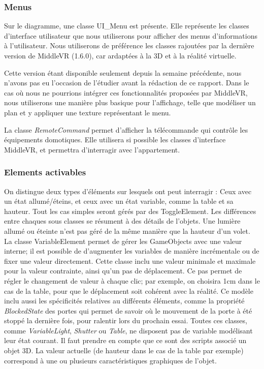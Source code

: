 \subsubsection{Menus}
Sur le diagramme, une classe UI\_Menu est présente. Elle représente les classes d'interface utilisateur que nous utiliserons pour afficher des menus d'informations à l'utilisateur. Nous utiliserons de préférence les classes rajoutées par la dernière version de MiddleVR (1.6.0), car ardaptées à la 3D et à la réalité virtuelle.\newline

Cette version étant disponible seulement depuis la semaine précédente, nous n'avons pas eu l'occasion de l'étudier avant la rédaction de ce rapport. Dans le cas où nous ne pourrions intégrer ces fonctionnalités proposées par MiddleVR, nous utiliserons une manière plus basique pour l'affichage, telle que modéliser un plan et y appliquer une texture représentant le menu.\newline

La classe \textit{RemoteCommand} permet d'afficher la télécommande qui contrôle les équipements domotiques. 
Elle utilisera si possible les classes d'interface MiddleVR, et permettra d'interragir avec l'appartement.


\subsubsection{Elements activables}
On distingue deux types d'éléments sur lesquels ont peut interragir : Ceux avec un état allumé/éteins, et ceux avec un état variable, comme la table et sa hauteur.
Tout les cas simples seront gérés par des ToggleElement. Les différences entre chaques sous classes se résument à des détails de l'objets.
Une lumière allumé ou éteinte n'est pas géré de la même manière que la hauteur d'un volet.
La classe VariableElement permet de gérer les GameObjects avec une valeur interne; il est possible de d'augmenter les variables de manière incrémentale ou de fixer une valeur directement.
Cette classe inclu une valeur minimale et maximale pour la valeur contrainte, ainsi qu'un pas de déplacement.
Ce pas permet de régler le changement de valeur à chaque clic; par exemple, on choisira 1cm dans le cas de la table, pour que le déplacement soit cohérent avec la réalité.
Ce modèle inclu aussi les spécificités relatives au différents éléments, comme la propriété \textit{BlockedState} des portes qui permet de savoir où le mouvement de la porte à été stoppé la dernière fois, pour ralentir lors du prochain essai.
\newline
Toutes ces classes, comme \textit{VariableLight}, \textit{Shutter} ou \textit{Table},  ne disposent pas de variable modélisant leur état courant. 
Il faut prendre en compte que ce sont des scripts associé un objet 3D. 
La valeur actuelle (de hauteur dans le cas de la table par exemple) correspond à une ou plusieurs caractéristiques graphiques de l'objet.

